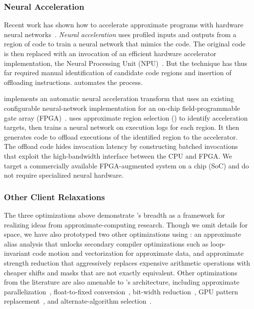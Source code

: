 \subsubsection{Neural Acceleration}
\label{accept:sec:npu}

Recent work has shown how to accelerate approximate programs with hardware
neural networks~\cite{benchnn, temam-isca, temam-isca13}.
\textit{Neural acceleration} uses profiled inputs and outputs from a region of
code to train a neural network that mimics the code.
The original code is then replaced with an invocation of an
efficient hardware accelerator implementation, the Neural Processing Unit
(NPU)~\cite{npu, anpu, snnap}.
But the technique has thus far required manual identification of candidate
code regions and insertion of offloading instructions.
\sysname automates the process.

\sysname implements an automatic neural acceleration transform
that uses an existing configurable neural-network implementation
for an on-chip field-programmable gate array (FPGA)~\cite{snnap}.
\sysname uses approximate region selection () to
identify acceleration targets, then trains a neural network on
execution logs for each region.
It then generates code to offload executions of the identified region to the
accelerator.
The offload code hides invocation latency by constructing batched invocations
that exploit the high-bandwidth interface between the CPU and FPGA.
We target a commercially available FPGA-augmented system on a chip (SoC) and
do not require specialized neural hardware.

\subsubsection{Other Client Relaxations}
The three optimizations above demonstrate \sysname's breadth as a
framework for realizing ideas from approximate-computing research.
Though we omit details for space, we have also prototyped
two other optimizations using \sysname:
an approximate alias analysis that unlocks secondary compiler optimizations such as
loop-invariant code motion and vectorization for approximate data, and
approximate strength reduction that aggressively replaces expensive arithmetic
operations with cheaper shifts and masks that are not exactly equivalent.
Other optimizations from the literature are also amenable to \sysname's
architecture, including approximate parallelization~\cite{quickstep},
float-to-fixed conversion~\cite{torftf},
bit-width reduction~\cite{bitwidthred, precimonious}, GPU pattern replacement~\cite{paraprox},
and alternate-algorithm selection~\cite{green, petabricks}.
